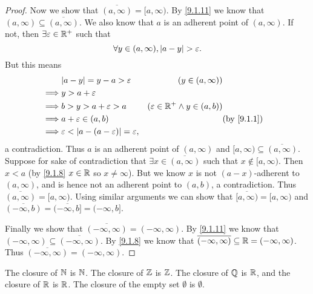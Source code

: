 \begin{proof}
  Now we show that \(\overline{(a, \infty)} = [a, \infty)\).
  By \cref{9.1.11} we know that \((a, \infty) \subseteq \overline{(a, \infty)}\).
  We also know that \(a\) is an adherent point of \((a, \infty)\).
  If not, then \(\exists \varepsilon \in \mathbb{R}^+\) such that
  \[
    \forall y \in (a, \infty), \left\lvert a - y\right\rvert > \varepsilon.
  \]
  But this means
  \begin{align}
             & \abs{a - y} = y - a > \varepsilon                        & (y \in (a, \infty))                                    \\
    \implies & y > a + \varepsilon                                                                                               \\
    \implies & b > y > a + \varepsilon > a                              & (\varepsilon \in \R^+ \land y \in (a, b))              \\
    \implies & a + \varepsilon \in (a, b)                               &                                           & \by{9.1.1} \\
    \implies & \varepsilon < \abs{a - (a - \varepsilon)} = \varepsilon,
  \end{align}
  a contradiction.
  Thus \(a\) is an adherent point of \((a, \infty)\) and \([a, \infty) \subseteq \overline{(a, \infty)}\).
  Suppose for sake of contradiction that \(\exists x \in \overline{(a, \infty)}\) such that \(x \notin [a, \infty)\).
  Then \(x < a\) (by \cref{9.1.8} \(x \in \mathbb{R}\) so \(x \neq \infty\)).
  But we know \(x\) is not \((a - x)\)-adherent to \((a, \infty)\), and is hence not an adherent point to \((a, b)\), a contradiction.
  Thus \(\overline{(a, \infty)} = [a, \infty)\).
  Using similar arguments we can show that \(\overline{[a, \infty)} = [a, \infty)\) and \(\overline{(-\infty, b)} = \overline{(-\infty, b]} = (-\infty, b]\).

  Finally we show that \(\overline{(-\infty, \infty)} = (-\infty, \infty)\).
  By \cref{9.1.11} we know that \((-\infty, \infty) \subseteq \overline{(-\infty, \infty)}\).
  By \cref{9.1.8} we know that \(\overline{(-\infty, \infty)} \subseteq \mathbb{R} = (-\infty, \infty)\).
  Thus \(\overline{(-\infty, \infty)} = (-\infty, \infty)\).
\end{proof}

\begin{lem}\label{9.1.13}
  The closure of \(\mathbb{N}\) is \(\mathbb{N}\).
  The closure of \(\mathbb{Z}\) is \(\mathbb{Z}\).
  The closure of \(\mathbb{Q}\) is \(\mathbb{R}\), and the closure of \(\mathbb{R}\) is \(\mathbb{R}\).
  The closure of the empty set \(\emptyset\) is \(\emptyset\).
\end{lem}

